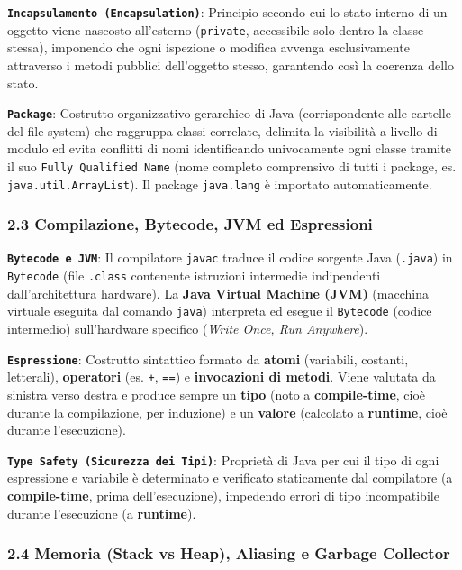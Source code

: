 \textbf{\texttt{Incapsulamento (Encapsulation)}}: Principio secondo cui lo stato interno di un oggetto viene nascosto all'esterno (\texttt{private}, accessibile solo dentro la classe stessa), imponendo che ogni ispezione o modifica avvenga esclusivamente attraverso i metodi pubblici dell'oggetto stesso, garantendo così la coerenza dello stato.

\textbf{\texttt{Package}}: Costrutto organizzativo gerarchico di Java (corrispondente alle cartelle del file system) che raggruppa classi correlate, delimita la visibilità a livello di modulo ed evita conflitti di nomi identificando univocamente ogni classe tramite il suo \texttt{Fully Qualified Name} (nome completo comprensivo di tutti i package, es. \texttt{java.util.ArrayList}). Il package \texttt{java.lang} è importato automaticamente.

\subsubsection{2.3 Compilazione, Bytecode, JVM ed Espressioni}\label{2-3-compilazione-bytecode-jvm-ed-espressioni}

\textbf{\texttt{Bytecode e JVM}}: Il compilatore \texttt{javac} traduce il codice sorgente Java (\texttt{.java}) in \texttt{Bytecode} (file \texttt{.class} contenente istruzioni intermedie indipendenti dall'architettura hardware). La \textbf{Java Virtual Machine (JVM)} (macchina virtuale eseguita dal comando \texttt{java}) interpreta ed esegue il \texttt{Bytecode} (codice intermedio) sull'hardware specifico (\emph{Write Once, Run Anywhere}).

\textbf{\texttt{Espressione}}: Costrutto sintattico formato da \textbf{atomi} (variabili, costanti, letterali), \textbf{operatori} (es. \texttt{+}, \texttt{==}) e \textbf{invocazioni di metodi}. Viene valutata da sinistra verso destra e produce sempre un \textbf{tipo} (noto a \textbf{compile-time}, cioè durante la compilazione, per induzione) e un \textbf{valore} (calcolato a \textbf{runtime}, cioè durante l'esecuzione).

\textbf{\texttt{Type Safety (Sicurezza dei Tipi)}}: Proprietà di Java per cui il tipo di ogni espressione e variabile è determinato e verificato staticamente dal compilatore (a \textbf{compile-time}, prima dell'esecuzione), impedendo errori di tipo incompatibile durante l'esecuzione (a \textbf{runtime}).

\subsubsection{2.4 Memoria (Stack vs Heap), Aliasing e Garbage Collector}\label{2-4-memoria-stack-vs-heap-aliasing-e-garbage-collector}

